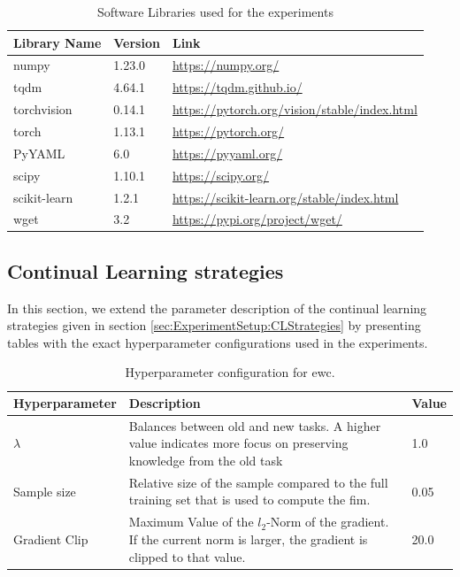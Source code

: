 \begin{table}[!htb]
    \centering
    \begin{tabular}{|l || l | l |} 
        \hline
        Library Name & Version & Link \\ 
        \hline 
        \hline
        numpy & 1.23.0 & \url{https://numpy.org/} \\
        \hline
        tqdm & 4.64.1 & \url{https://tqdm.github.io/}  \\
        \hline
        torchvision & 0.14.1 & \url{https://pytorch.org/vision/stable/index.html} \\ 
        \hline
        torch & 1.13.1 & \url{https://pytorch.org/} \\
        \hline
        PyYAML & 6.0 & \url{https://pyyaml.org/} \\
        \hline
        scipy & 1.10.1 & \url{https://scipy.org/} \\
        \hline
        scikit-learn & 1.2.1 & \url{https://scikit-learn.org/stable/index.html} \\
        \hline
        wget & 3.2 & \url{https://pypi.org/project/wget/} \\
        \hline
    \end{tabular}
    \caption{Software Libraries used for the experiments}
    \label{fig:Libraries}
\end{table}

\subsection{Continual Learning strategies}
\label{sec:Appendix:CLStrategies}
In this section, we extend the parameter description of the continual learning strategies given in section 
\ref{sec:ExperimentSetup:CLStrategies} by presenting tables with the exact hyperparameter configurations
used in the experiments.

\begin{table}[!htb]
    \begin{tabularx}{\textwidth}{|l | X | l |} 
        \hline
        Hyperparameter & Description & Value \\ 
        \hline 
        \hline
        $\lambda$ & Balances between old and new tasks. A higher value indicates more focus 
        on preserving knowledge from the old task & 1.0  \\ 
        \hline
        Sample size & Relative size of the sample compared to the full training set that is used to 
        compute the \gls{fim}. & 0.05  \\ 
        \hline
        Gradient Clip & Maximum Value of the $l_2$-Norm of the gradient. If the current norm is larger,
        the gradient is clipped to that value. & 20.0 \\ 
        \hline
    \end{tabularx}
    \caption{Hyperparameter configuration for \gls{ewc}.}
    \label{fig:EWCparams}
\end{table}

